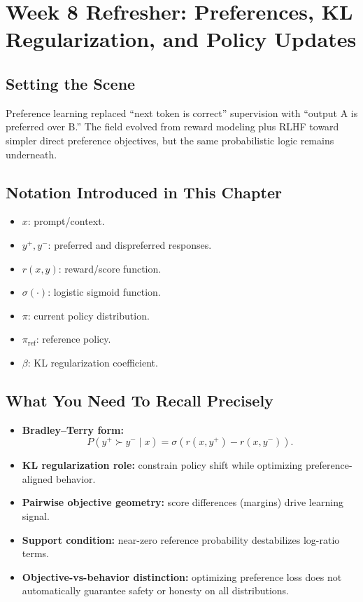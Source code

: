 \section{Week 8 Refresher: Preferences, KL Regularization, and Policy Updates}

\subsection*{Setting the Scene}
Preference learning replaced ``next token is correct'' supervision with ``output A is preferred over B.'' The field evolved from reward modeling plus RLHF toward simpler direct preference objectives, but the same probabilistic logic remains underneath.

\subsection*{Notation Introduced in This Chapter}
\begin{itemize}[leftmargin=1.5em]
  \item $x$: prompt/context.
  \item $y^+, y^-$: preferred and dispreferred responses.
  \item $r(x,y)$: reward/score function.
  \item $\sigma(\cdot)$: logistic sigmoid function.
  \item $\pi$: current policy distribution.
  \item $\pi_{\mathrm{ref}}$: reference policy.
  \item $\beta$: KL regularization coefficient.
\end{itemize}

\subsection*{What You Need To Recall Precisely}
\begin{itemize}[leftmargin=1.5em]
  \item \textbf{Bradley--Terry form:}
  \[
    P(y^+ \succ y^- \mid x)=\sigma(r(x,y^+)-r(x,y^-)).
  \]
  \item \textbf{KL regularization role:} constrain policy shift while optimizing preference-aligned behavior.
  \item \textbf{Pairwise objective geometry:} score differences (margins) drive learning signal.
  \item \textbf{Support condition:} near-zero reference probability destabilizes log-ratio terms.
  \item \textbf{Objective-vs-behavior distinction:} optimizing preference loss does not automatically guarantee safety or honesty on all distributions.
\end{itemize}

